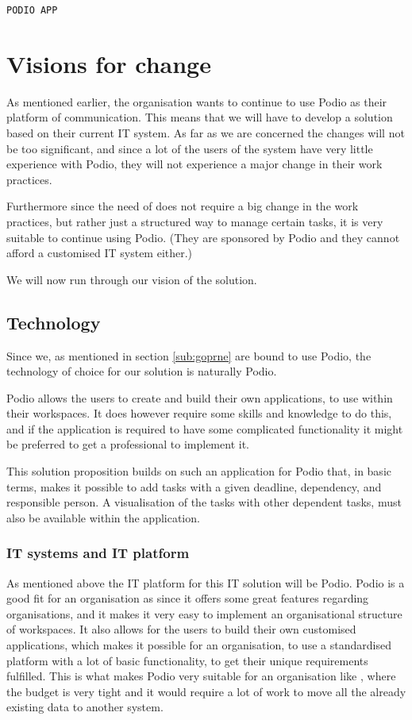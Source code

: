 \texttt{PODIO APP}
\section{Visions for change}
As mentioned earlier, the organisation wants to continue to use Podio as their platform of
communication. This means that we will have to develop a solution based on their current IT system.
As far as we are concerned the changes will not be too significant, and since a lot of the users of
the system have very little experience with Podio, they will not experience a major change in their
work practices. 

Furthermore since the need of \mil does not require a big change in the work practices, but rather
just a structured way to manage certain tasks, it is very suitable to continue using Podio. (They
are sponsored by Podio and they cannot afford a customised IT system either.)

We will now run through our vision of the solution.

\subsection{Technology}
\label{sub:technology}
Since we, as mentioned in section \ref{sub:goprne} are bound to use Podio, the technology of choice
for our solution is naturally Podio. 

Podio allows the users to create and build their own applications, to use within their workspaces.
It does however require some skills and knowledge to do this, and if the application is required to
have some complicated functionality it might be preferred to get a professional to implement it.

This solution proposition builds on such an application for Podio that, in basic terms, makes it possible to add
tasks with a given deadline, dependency, and responsible person. A visualisation of the tasks with
other dependent tasks, must also be available within the application. 

\subsubsection{IT systems and IT platform}

As mentioned above the IT platform for this IT solution will be Podio. Podio is a good fit for an
organisation as \mil since it offers some great features regarding organisations, and it makes it
very easy to implement an organisational structure of workspaces. It also allows for the users to
build their own customised applications, which makes it possible for an organisation, to use a
standardised platform with a lot of basic functionality, to get their unique requirements fulfilled.
This is what makes Podio very suitable for an organisation like \milNO, where the budget is very
tight and it would require a lot of work to move all the already existing data to another system.

